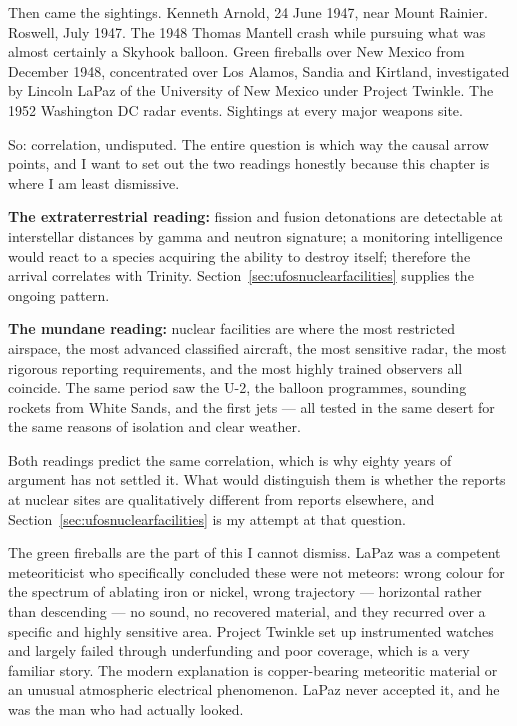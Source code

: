 Then came the sightings. Kenneth Arnold, 24 June 1947, near Mount Rainier. Roswell, July 1947.
The 1948 Thomas Mantell crash while pursuing what was almost certainly a Skyhook balloon. Green
fireballs over New Mexico from December 1948, concentrated over Los Alamos, Sandia and Kirtland,
investigated by Lincoln LaPaz of the University of New Mexico under Project Twinkle. The 1952
Washington DC radar events. Sightings at every major weapons site.

So: correlation, undisputed. The entire question is which way the causal arrow points, and I want
to set out the two readings honestly because this chapter is where I am least dismissive.

\textbf{The extraterrestrial reading:} fission and fusion detonations are detectable at
interstellar distances by gamma and neutron signature; a monitoring intelligence would react to a
species acquiring the ability to destroy itself; therefore the arrival correlates with Trinity.
Section~\ref{sec:ufosnuclearfacilities} supplies the ongoing pattern.

\textbf{The mundane reading:} nuclear facilities are where the most restricted airspace, the most
advanced classified aircraft, the most sensitive radar, the most rigorous reporting requirements,
and the most highly trained observers all coincide.  The
same period saw the U-2, the balloon programmes, sounding rockets from White Sands, and the first
jets --- all tested in the same desert for the same reasons of isolation and clear weather.

Both readings predict the same correlation, which is why eighty years of argument has not settled
it. What would distinguish them is whether the reports at nuclear sites are qualitatively
different from reports elsewhere, and Section~\ref{sec:ufosnuclearfacilities} is my attempt at that question.

\begin{funfact}
The green fireballs are the part of this I cannot dismiss. LaPaz was a competent meteoriticist who
specifically concluded these were not meteors: wrong colour for the spectrum of ablating iron or
nickel, wrong trajectory --- horizontal rather than descending --- no sound, no recovered material,
and they recurred over a specific and highly sensitive area. Project Twinkle set up instrumented
watches and largely failed through underfunding and poor coverage, which is a very familiar story.
The modern explanation is copper-bearing meteoritic material or an unusual atmospheric electrical
phenomenon. LaPaz never accepted it, and he was the man who had actually looked.
\end{funfact}

